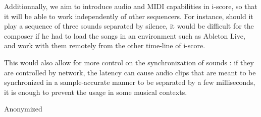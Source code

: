 \documentclass{article}
\begin{document}
Additionnally, we aim to introduce audio and MIDI capabilities in i-score, so that 
it will be able to work independently of other sequencers.
For instance, should it play a sequence of three sounds separated by silence, 
it would be difficult for the composer if he had to load 
the songs in an environment such as Ableton Live, and work with them remotely from the other time-line of i-score.

This would also allow for more control on the synchronization of sounds : if they are controlled by network, 
the latency can cause audio clips that are meant to be synchronized in a sample-accurate manner to be separated by a few milliseconds, it is enough to prevent the usage in some musical contexts.

\begin{acknowledgments}
    Anonymized %
\end{acknowledgments} 


\end{document}
